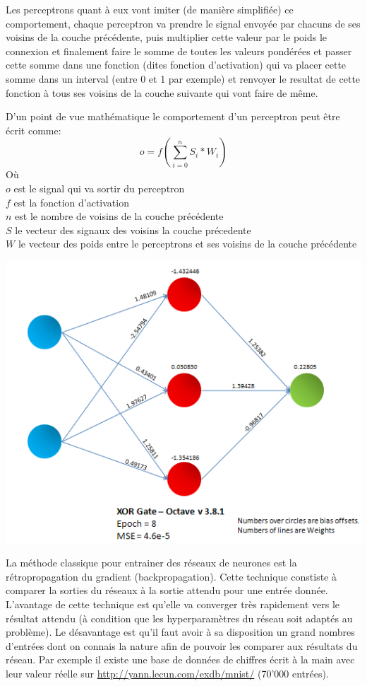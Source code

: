 \documentclass{article}
\begin{document}
Les perceptrons quant à eux vont imiter (de manière simplifiée) ce comportement, chaque perceptron va prendre le signal envoyée par chacuns de ses voisins de la couche précédente, puis multiplier cette valeur par le poids le connexion et finalement faire le somme de toutes les valeurs pondérées et passer cette somme dans une fonction (dites fonction d'activation) qui va placer cette somme dans un interval (entre 0 et 1 par exemple) et renvoyer le resultat de cette fonction à tous ses voisins de la couche suivante qui vont faire de même.

D'un point de vue mathématique le comportement d'un perceptron peut être écrit comme:
\begin{equation}
o = f(\sum_{i=0}^{n} S_i * W_i)
\end{equation}
Où\\
$o$ est le signal qui va sortir du perceptron\\
$f$ est la fonction d'activation\\
$n$ est le nombre de voisins de la couche précédente\\
$S$ le vecteur des signaux des voisins la couche précedente\\
$W$ le vecteur des poids entre le perceptrons et ses voisins de la couche précédente

\begin{center}
\includegraphics[scale=0.5]{XOR_Gate.png}
\end{center}

La méthode classique pour entrainer des réseaux de neurones est la rétropropagation du gradient (backpropagation). Cette technique constiste à comparer la sorties du réseaux à la sortie attendu pour une entrée donnée. L'avantage de cette technique est qu'elle va converger très rapidement vers le résultat attendu (à condition que les hyperparamètres du réseau soit adaptés au problème). Le désavantage est qu'il faut avoir à sa disposition un grand nombres d'entrées dont on connais la nature afin de pouvoir les comparer aux résultats du réseau. Par exemple il existe une base de données de chiffres écrit à la main avec leur valeur réelle sur \url{http://yann.lecun.com/exdb/mnist/} (70'000 entrées).\\
\end{document}

